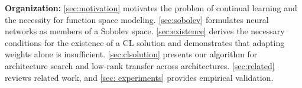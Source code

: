 


\noindent\textbf{Organization:}
\cref{sec:motivation} motivates the problem of continual learning and the necessity for function space modeling. \cref{sec:sobolev} formulates neural networks as members of a Sobolev space. \cref{sec:existence} derives the necessary conditions for the existence of a CL solution and demonstrates that adapting weights alone is insufficient. \cref{sec:clsolution} presents our algorithm for architecture search and low-rank transfer across architectures. \cref{sec:related} reviews related work, and \cref{sec: experiments} provides empirical validation.


